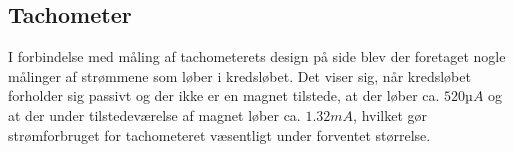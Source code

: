 \subsection{Tachometer}

I forbindelse med måling af tachometerets design på side \pageref{sub:systemarkitektur_tachometer} blev der foretaget nogle målinger af strømmene som løber i kredsløbet. Det viser sig, når kredsløbet forholder sig passivt og der ikke er en magnet tilstede, at der løber ca. $520µA$ og at der under tilstedeværelse af magnet løber ca. $1.32mA$, hvilket gør strømforbruget for tachometeret væsentligt under forventet størrelse.